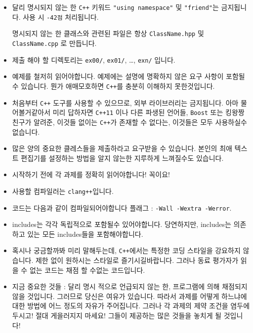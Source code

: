 \begin{itemize}
        \item 달리 명시되지 않는 한 \texttt{C++} 키워드 \texttt{"using namespace"} 및 \texttt{"friend"}는 금지됩니다. 사용 시 \texttt {-42점} 처리됩니다.

         명시되지 않는 한 클래스와 관련된 파일은 항상 \texttt{ClassName.hpp}  및\texttt{ClassName.cpp}
   로 만듭니다.

        \item 제출 해야 할 디렉토리는 \texttt{ex00/}, \texttt{ex01/}, \dots, \texttt{exn/} 입니다.

        \item 예제를 철저히 읽어야합니다. 예제에는 설명에 명확하지 않은 요구 사항이 포함될 수 있습니다. 뭔가 애매모호하면 \texttt{C++}를 충분히 이해하지 못한것입니다.

        \item 처음부터  \texttt{C++} 도구를 사용할 수 있으므로, 외부 라이브러리는 금지됩니다. 아마 물어볼거같아서 미리 답하자면  \texttt{C++11} 이나 다른 파생된 언어들,  \texttt{Boost} 또는 킹왕짱 친구가 알려준, 이것들 없이는 \texttt{C++}가 존재할 수 없다는, 이것들은 모두 사용하실수 없습니다.

        \item 많은 양의 중요한 클레스들을 제출하라고 요구받을 수 있습니다. 본인의 최애 텍스트 편집기를 설정하는 방법을 알지 않는한 지루하게 느껴질수도 있습니다.

        \item 시작하기 전에 각 과제를 정확히 읽어야합니다! 꼭이요!

        \item 사용할 컴파일러는 \texttt{clang++}입니다.

        \item 코드는 다음과 같이 컴파일되어야합니다
          플래그 : \texttt{-Wall -Wextra -Werror}.

        \item includes는 각각 독립적으로  포함될수 있어야합니다. 당연하지만, includes는 의존하고 있는 모든 includes들을 포함해야합니다.

        \item 혹시나 궁금할까봐 미리 말해두는데, \texttt{C++}에서는 특정한 코딩 스타일을 강요하지 않습니다. 제한 없이 원하시는 스타일로 즐기시길바랍니다. 그러나 동료 평가자가 읽을 수 없는 코드는 채점 할 수없는 코드입니다.

 	   \item 지금 중요한 것들 : 달리 명시 적으로 언급되지 않는 한, 프로그램에 의해 채점되지 않을 것입니다. 그러므로 당신은 여유가 있습니다. 따라서 과제를 어떻게 하느냐에 대한 방법에 어느 정도의 자유가 주어집니다. 그러나 각 과제의 제약 조건을 염두에 두시고! 절대 게을러지지 마세요! 그들이 제공하는 많은 것들을 놓치게 될 것입니다!


\end{itemize}
